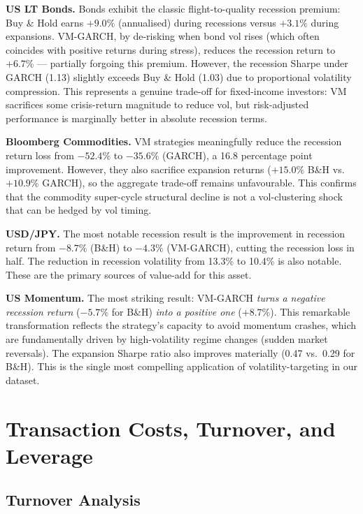 \documentclass[12pt, a4paper]{article}
\begin{document}
\textbf{US LT Bonds.} Bonds exhibit the classic flight-to-quality recession premium: Buy
\& Hold earns $+9.0\%$ (annualised) during recessions versus $+3.1\%$ during expansions.
VM-GARCH, by de-risking when bond vol rises (which often coincides with positive returns
during stress), reduces the recession return to $+6.7\%$ --- partially forgoing this
premium. However, the recession Sharpe under GARCH (1.13) slightly exceeds Buy \& Hold
(1.03) due to proportional volatility compression. This represents a genuine trade-off
for fixed-income investors: VM sacrifices some crisis-return magnitude to reduce vol, but
risk-adjusted performance is marginally better in absolute recession terms.

\textbf{Bloomberg Commodities.} VM strategies meaningfully reduce the recession return
loss from $-52.4\%$ to $-35.6\%$ (GARCH), a 16.8 percentage point improvement. However,
they also sacrifice expansion returns ($+15.0\%$ B\&H vs.\ $+10.9\%$ GARCH), so the
aggregate trade-off remains unfavourable. This confirms that the commodity super-cycle
structural decline is not a vol-clustering shock that can be hedged by vol timing.

\textbf{USD/JPY.} The most notable recession result is the improvement in recession return
from $-8.7\%$ (B\&H) to $-4.3\%$ (VM-GARCH), cutting the recession loss in half.
The reduction in recession volatility from 13.3\% to 10.4\% is also notable. These are
the primary sources of value-add for this asset.

\textbf{US Momentum.} The most striking result: VM-GARCH \emph{turns a negative recession
return} ($-5.7\%$ for B\&H) \emph{into a positive one} ($+8.7\%$). This remarkable
transformation reflects the strategy's capacity to avoid momentum crashes, which are
fundamentally driven by high-volatility regime changes (sudden market reversals). The
expansion Sharpe ratio also improves materially (0.47 vs.\ 0.29 for B\&H). This is the
single most compelling application of volatility-targeting in our dataset.


\section{Transaction Costs, Turnover, and Leverage}
\label{sec:tc}

\subsection{Turnover Analysis}
\end{document}
